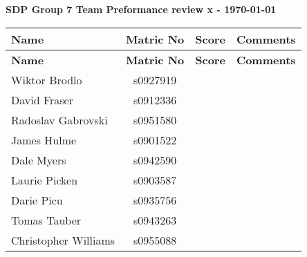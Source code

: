 \documentclass[10pt, a4paper]{article} %
\begin{document}
\textbf{SDP Group 7 Team Preformance review x - \today}


\begin{longtable}{l c c p{3cm}}
    \textbf{Name} &
    \textbf{Matric No} &
    \textbf{Score} &
    \textbf{Comments}\\
    \hline
    \endfirsthead


    \textbf{Name} &
    \textbf{Matric No} &
    \textbf{Score} &
    \textbf{Comments}\\
    \hline
    \endhead

    Wiktor Brodlo &
    s0927919 &
    &
    \\

    David Fraser &
    s0912336 &
    &
    \\

    Radoslav Gabrovski &
    s0951580 &
    & 
    \\

    James Hulme &
    s0901522 &
    & 
    \\

    Dale Myers &
    s0942590 &
    &
    \\

    Laurie Picken &
    s0903587 &
    &
    \\

    Darie Picu &
    s0935756 &
    &
    \\

    Tomas Tauber &
    s0943263 &
    &
    \\

    Christopher Williams &
    s0955088 &
    &
    \\


\end{longtable}
\end{document}
